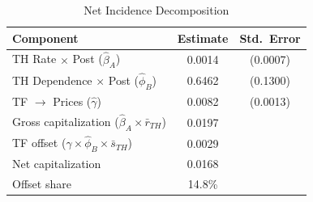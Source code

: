 \begin{table}[htbp]
\centering
\caption{Net Incidence Decomposition}
\label{tab:incidence}
\begin{tabular}{lcc}
\toprule
Component & Estimate & Std.\ Error \\
\midrule
TH Rate $\times$ Post ($\hat{\beta}_A$) & 0.0014 & (0.0007) \\
TH Dependence $\times$ Post ($\hat{\phi}_B$) & 0.6462 & (0.1300) \\
TF $\rightarrow$ Prices ($\hat{\gamma}$) & 0.0082 & (0.0013) \\
\addlinespace
Gross capitalization ($\hat{\beta}_A \times \bar{r}_{TH}$) & 0.0197 & \\
TF offset ($\hat{\gamma} \times \hat{\phi}_B \times \bar{s}_{TH}$) & 0.0029 & \\
Net capitalization & 0.0168 & \\
Offset share & 14.8\% & \\
\bottomrule
\end{tabular}
\end{table}

